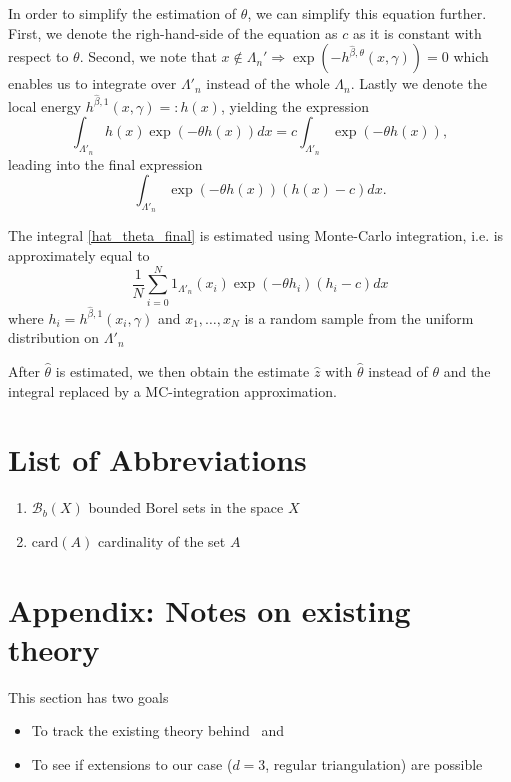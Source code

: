 \documentclass[12pt,a4paper]{report}
\begin{document}
In order to simplify the estimation of $\theta$, we can simplify this equation further. First, we denote the righ-hand-side of the equation as $c$ as it  is constant with respect to $\theta$. Second, we note that $x \notin \Lambda_n'  \Rightarrow \exp{\left(-h^{\hat\beta,\theta}(x,\gamma)\right)}= 0$ which enables us to integrate over $\Lambda'_n$ instead of the whole $\Lambda_n$. Lastly we denote the local energy $h^{\hat\beta,1}(x,\gamma) =: h(x)$, yielding the expression
$$ \int_{\Lambda'_n} h(x) \exp{\left(-\theta h(x)\right)} dx = c \int_{\Lambda'_n} \exp{\left(-\theta h(x)\right)}, $$
leading into the final expression
\begin{equation}\label{hat_theta_final} 
\int_{\Lambda'_n} \exp{\left(-\theta h(x)\right)} (h(x) - c) dx .
\end{equation}

The integral \ref{hat_theta_final} is estimated using Monte-Carlo integration, i.e. is approximately equal to
$$ \frac 1N \sum_{i=0}^N 1_{\Lambda'_n}(x_i) \exp{\left( - \theta h_i \right )} (h_i- c) dx $$
where $h_i = h^{\hat\beta,1}(x_i, \gamma)$ and $x_1,\dots,x_N$ is a random sample from the uniform distribution on $\Lambda'_n$

After $\hat\theta$ is estimated, we then obtain the estimate $\hat z$ with $\hat\theta$ instead of $\theta$ and the integral replaced by a MC-integration approximation.



{}



\listoftodos

\section*{List of Abbreviations}
\begin{enumerate}
    \item $\mathcal B_b(X)$ bounded Borel sets in the space $X$
    \item $\text{card}(A)$ cardinality of the set $A$
\end{enumerate}

\section*{Appendix: Notes on existing theory}
This section has two goals
\begin{itemize}
\item To track the existing theory behind~\cite{DL10} and
\item To see if extensions to our case ($d=3$, regular triangulation) are possible
\end{itemize}
\end{document}
